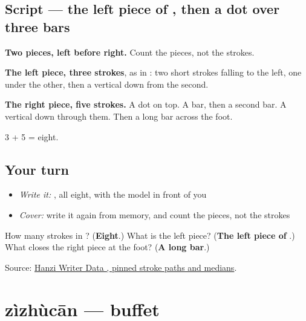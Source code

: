 \subsection*{Script — the left piece of , then a dot over three bars}

\begin{quote}
\end{quote}

\textbf{Two pieces, left before right.} Count the pieces, not the strokes.

\textbf{The left piece, three strokes}, as in : two short strokes falling to the left, one under the other, then a vertical down from the second.

\textbf{The right piece, five strokes.} A dot on top. A bar, then a second bar. A vertical down through them. Then a long bar across the foot.

3 + 5 = eight.

\subsection*{Your turn}
\begin{itemize}
\raggedright
  \item \emph{Write it:} , all eight, with the model in front of you
  \item \emph{Cover:} write it again from memory, and count the pieces, not the strokes
\end{itemize}

\begin{tcolorbox}[breakable,colback=teal!4,colframe=teal!35!black,title={Before you move on}]
How many strokes in ? (\textbf{Eight}.) What is the left piece? (\textbf{The left piece of }.) What closes the right piece at the foot? (\textbf{A long bar}.)

Source: \href{https://raw.githubusercontent.com/chanind/hanzi-writer-data/68d10a4b21150cae5e1ebbd223eed289cf32d90c/data/\%E5\%BE\%80.json}{Hanzi Writer Data , pinned stroke paths and medians}.
\end{tcolorbox}
\section[zìzhùcān]{zìzhùcān — buffet}

\label{lesson:ZH-C427-zizhucan}



